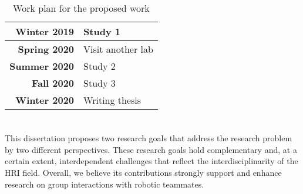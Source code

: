 \begin{table}[h]
\centering
\caption{Work plan for the proposed work}
\begin{tabular}{|r|l|} 
\hline
\textbf{Winter 2019} & Study 1            \\ 
\hline
\textbf{Spring 2020} & Visit another lab  \\ 
\hline
\textbf{Summer 2020} & Study 2            \\ 
\hline
\textbf{Fall 2020}   & Study 3            \\ 
\hline
\textbf{Winter 2020} & Writing thesis     \\
\hline
\end{tabular}
\end{table}

\section*{\centering*}
This dissertation proposes two research goals that address the research problem by two different perspectives. These research goals hold complementary and, at a certain extent, interdependent challenges that reflect the interdisciplinarity of the HRI field. Overall, we believe its contributions strongly support and enhance research on group interactions with robotic teammates.